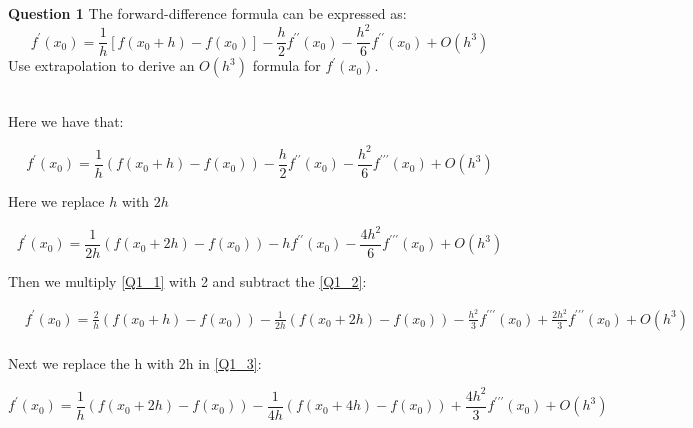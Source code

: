 

\begin{tcolorbox}
\textbf{Question 1} The forward-difference formula can be expressed as:
$$
f^{\prime}\left(x_{0}\right)=\frac{1}{h}\left[f\left(x_{0}+h\right)-f\left(x_{0}\right)\right]-\frac{h}{2} f^{\prime \prime}\left(x_{0}\right)-\frac{h^{2}}{6} f^{\prime \prime}\left(x_{0}\right)+O\left(h^{3}\right)
$$
Use extrapolation to derive an $O\left(h^{3}\right)$ formula for $f^{\prime}\left(x_{0}\right)$.
\end{tcolorbox}

\begin{solution}\ \\
Here we have that:


\begin{equation}
	f^{\prime}\left(x_{0}\right)=\frac{1}{h}\left(f\left(x_{0}+h\right)-f\left(x_{0}\right)\right)-\frac{h}{2} f^{\prime \prime}\left(x_{0}\right)-\frac{h^{2}}{6} f^{\prime \prime \prime}\left(x_{0}\right)+O\left(h^{3}\right) \label{Q1_1}
\end{equation}



Here we replace $h$ with $2h$


\begin{equation}
f^{\prime}\left(x_{0}\right)=\frac{1}{2 h}\left(f\left(x_{0}+2 h\right)-f\left(x_{0}\right)\right)-h f^{\prime \prime}\left(x_{0}\right)-\frac{4 h^{2}}{6} f^{\prime \prime \prime}\left(x_{0}\right) +O\left(h^{3}\right) \label{Q1_2}
\end{equation} 

Then we multiply \ref{Q1_1} with 2 and subtract the \ref{Q1_2}:


\begin{equation}
\begin{aligned}
&f^{\prime}\left(x_{0}\right)=\frac{2}{h}\left(f\left(x_{0}+h\right)-f\left(x_{0}\right)\right)-\frac{1}{2 h}\left(f\left(x_{0}+2 h\right)-f\left(x_{0}\right)\right)-\frac{h^{2}}{3} f^{\prime \prime \prime}\left(x_{0}\right)+\frac{2 h^{2}}{3} f^{\prime \prime \prime}\left(x_{0}\right)+O\left(h^{3}\right) \\
& \label{Q1_3}
\end{aligned}
\end{equation}



Next we replace the h with 2h in \ref{Q1_3}:


\begin{equation}
f^{\prime}\left(x_{0}\right)=\frac{1}{h}\left(f\left(x_{0}+2 h\right)-f\left(x_{0}\right)\right)-\frac{1}{4 h}\left(f\left(x_{0}+4 h\right)-f\left(x_{0}\right)\right)+\frac{4 h^{2}}{3} f^{\prime \prime \prime}\left(x_{0}\right)+O\left(h^{3}\right) \label{Q1_4}
\end{equation}


\end{solution}
